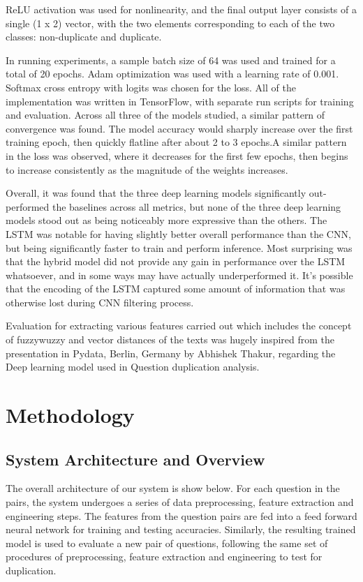 ReLU activation was used for nonlinearity, and the final output layer consists of a single (1 x 2) vector, with the two
elements corresponding to each of the two classes: non-duplicate and duplicate.

In running experiments, a sample batch size of 64 was used and trained for a total of 20 epochs. Adam optimization was used with a learning rate of 0.001. Softmax cross entropy with logits was chosen for the loss. All of the implementation was written in TensorFlow, with separate run scripts for training and evaluation. Across all three of the models studied, a similar pattern of convergence was found. The model accuracy would sharply increase over the first training epoch, then quickly flatline after about 2 to 3 epochs.A similar pattern in the loss was observed, where it decreases for the first few epochs, then begins to increase consistently as the magnitude of the weights increases. 

Overall, it was found that the three deep learning models significantly out-performed the baselines across all metrics, but none of the three deep learning models stood out as being noticeably more expressive than the others. The \ac{LSTM} was notable for having slightly better overall performance than the \ac{CNN}, but being significantly faster to train and perform inference. Most surprising was that the hybrid model did not provide any gain in performance over the
\ac{LSTM} whatsoever, and in some ways may have actually underperformed it. It’s possible that the encoding of the LSTM captured some amount of information that was otherwise lost during \ac{CNN} filtering process.


Evaluation for extracting various features carried out which includes the concept of fuzzywuzzy and vector distances of the texts was hugely inspired from the presentation in Pydata, Berlin, Germany by Abhishek Thakur, regarding the Deep learning model\cite{AbskThakur} used in Question duplication analysis.

\chapter{Methodology}
\section{System Architecture and Overview}
The overall architecture of our system is show below. For each question in the pairs, the system undergoes a series of data preprocessing, feature extraction and engineering steps. The features from the question pairs are fed into a feed forward neural network for training and testing accuracies. Similarly, the resulting trained model is used to evaluate a new pair of questions, following the same set of procedures of preprocessing, feature extraction and engineering to test for duplication.

